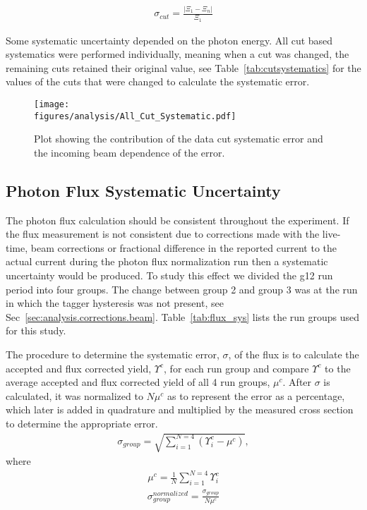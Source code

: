 \begin{align}
\sigma_{cut} = \frac{\left| \Xi_1 - \Xi_n \right|}{\Xi_1}
\end{align}

Some systematic uncertainty depended on the photon energy. All cut based systematics were performed individually, meaning when a cut was changed, the remaining cuts retained their original value, see Table~\ref{tab:cutsystematics} for the values of the cuts that were changed to calculate the systematic error.


\begin{figure}[h!]\begin{center}
\texttt{[image: \\figures/analysis/All\_Cut\_Systematic.pdf]}
\caption[Plot showing the contribution of the data cut systematic error and the incoming beam dependence of the error]{\label{fig:sys_cut_error} Plot showing the contribution of the data cut systematic error and the incoming beam dependence of the error.}
\end{center}\end{figure}
\FloatBarrier
\subsection{Photon Flux Systematic Uncertainty}
The photon flux calculation should be consistent throughout the experiment. If the flux measurement is not consistent due to corrections made with the live-time, beam corrections or fractional difference in the reported current to the actual current during the photon flux normalization run then a systematic uncertainty would be produced. To study this effect we divided the g12 run period into four groups. The change between group 2 and group 3 was at the run in which the tagger hysteresis was not present, see Sec~\ref{sec:analysis.corrections.beam}. Table~\ref{tab:flux_sys} lists the run groups used for this study.


The procedure to determine the systematic error, $\sigma$, of the flux is to calculate the accepted and flux corrected yield, $\Upsilon^c$, for each run group and compare $\Upsilon^c$ to the average accepted and flux corrected yield of all 4 run groups, $\mu^c$. After $\sigma$ is calculated, it was normalized to $N \mu^c$ as to represent the error as a percentage, which later is added in quadrature and  multiplied by the measured cross section to determine the appropriate error. 
\begin{align}
\sigma_{group} = \sqrt{\sum_{i=1}^{N = 4}\left(\Upsilon_i^c - \mu^c\right)},
\end{align}
where
\begin{align}
\mu^c = \frac{1}{N}\sum_{i=1}^{N=4}\Upsilon_i^c
\end{align}
\begin{align}
\sigma_{group}^{normalized} = \frac{\sigma_{group}}{N\mu^c}
\end{align}

